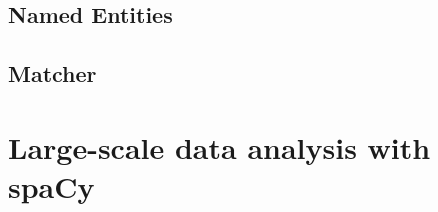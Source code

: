 

\subsection{Named Entities}


\subsection{Matcher}









\section*{Large-scale data analysis with spaCy}


















